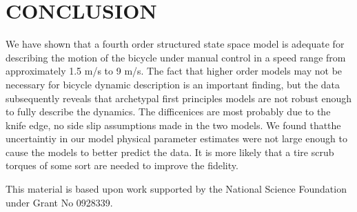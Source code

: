 \documentclass[twocolumn,10pt]{asme2e}
\begin{document}
\section*{CONCLUSION}
We have shown that a fourth order structured state space model is adequate for
describing the motion of the bicycle under manual control in a speed range from
approximately 1.5 m/s to 9 m/s. The fact that higher order models may not be
necessary for bicycle dynamic description is an important finding, but the
data subsequently reveals that archetypal first principles models are not
robust enough to fully describe the dynamics. The difficenices are most
probably due to the knife edge, no side slip assumptions made in the two
models. We found thatthe uncertaintiy in our model physical parameter estimates
were not large enough to cause the models to better predict the data. It is
more likely that a tire scrub torques of some sort are needed to improve the
fidelity.

\begin{acknowledgment}
	This material is based upon work supported by the National Science Foundation
	under Grant No 0928339.
\end{acknowledgment}



\end{document}
